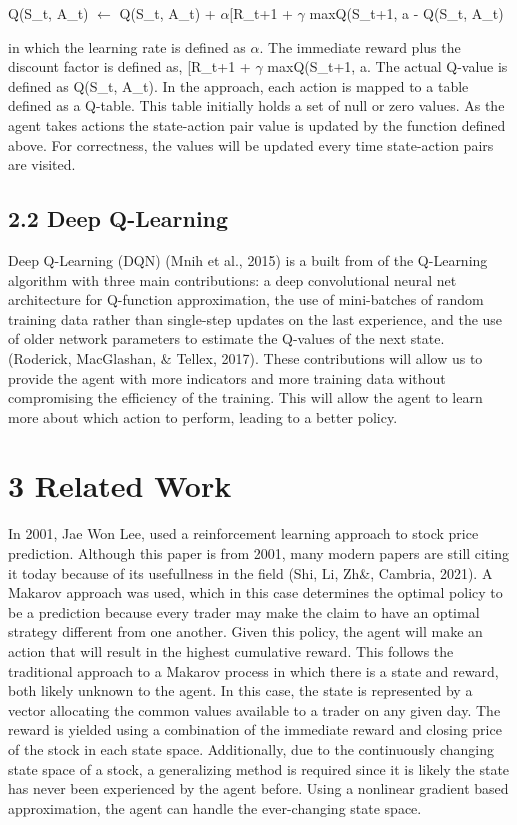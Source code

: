 \documentclass[letterpaper]{article}
\begin{document}
Q(S\_{t}, A\_{t}) $\leftarrow$ Q(S\_{t}, A\_{t}) + $\alpha$[R\_{t+1} + $\gamma$ maxQ(S\_{t+1, a} - Q(S\_{t}, A\_{t})
	

in which the learning rate is defined as $\alpha$. The immediate reward plus the discount factor is defined as, [R\_{t+1} + $\gamma$ maxQ(S\_{t+1, a}. The actual Q-value is defined as Q(S\_{t}, A\_{t}).
In the approach, each action is mapped to a table defined as a Q-table. This table initially holds a set of null or zero values. As the agent takes actions the state-action pair value is updated by the function defined above. For correctness, the values will be updated every time state-action pairs are visited. 

\subsection{2.2 Deep Q-Learning} 
Deep Q-Learning (DQN) (Mnih et al., 2015) is a built from of the Q-Learning algorithm with three main contributions: a deep convolutional neural net architecture for Q-function approximation,
the use of mini-batches of random training data rather than single-step updates on the last experience, and the use of older network parameters to estimate the Q-values of the next state. (Roderick, MacGlashan, \& Tellex, 2017). These contributions will allow us to provide the agent with more indicators and more training data without compromising the efficiency of the training. This will allow the agent to learn more about which action to perform, leading to a better policy.

\section{3 Related Work}
In 2001, Jae Won Lee, used a reinforcement learning approach to stock price prediction. Although this paper is from 2001, many modern papers are still citing it today because of its usefullness in the field (Shi, Li, Zh\&, Cambria, 2021). A Makarov approach was used, which in this case determines the optimal policy to be a prediction because every trader may make the claim to have an optimal strategy different from one another. Given this policy, the agent will make an action that will result in the highest cumulative reward. This follows the traditional approach to a Makarov process in which there is a state and reward, both likely unknown to the agent. In this case, the state is represented by a vector allocating the common values available to a trader on any given day. The reward is yielded using a combination of the immediate reward and closing price of the stock in each state space. Additionally, due to the continuously changing state space of a stock, a generalizing method is required since it is likely the state has never been experienced by the agent before. Using a nonlinear gradient based approximation, the agent can handle the ever-changing state space.
\end{document}
